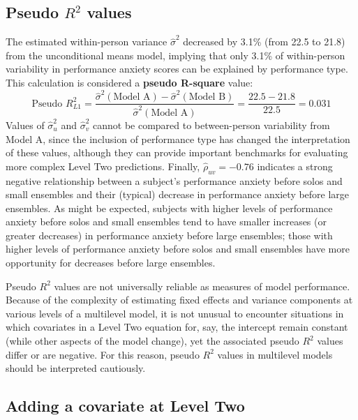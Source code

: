 \documentclass[
]{krantz}
\begin{document}
\hypertarget{pseudoR2}{%
\subsection{\texorpdfstring{Pseudo \(R^2\) values}{Pseudo R\^{}2 values}}\label{pseudoR2}}

The estimated within-person variance \(\hat{\sigma}^2\) decreased by 3.1\% (from 22.5 to 21.8) from the unconditional means model, implying that only 3.1\% of within-person variability in performance anxiety scores can be explained by performance type. This calculation is considered a \textbf{pseudo R-square} value:
\begin{equation}
\textrm{Pseudo }R^2_{L1} = \frac{\hat{\sigma}^{2}(\textrm{Model A})-\hat{\sigma}^{2}(\textrm{Model B})}{\hat{\sigma}^{2}(\textrm{Model A})} = \frac{22.5-21.8}{22.5} = 0.031
\label{eq:pseudo}
\end{equation}
Values of \(\hat{\sigma}_{u}^{2}\) and \(\hat{\sigma}_{v}^{2}\) cannot be compared to between-person variability from Model A, since the inclusion of performance type has changed the interpretation of these values, although they can provide important benchmarks for evaluating more complex Level Two predictions. Finally, \(\hat{\rho}_{uv}=-0.76\) indicates a strong negative relationship between a subject's performance anxiety before solos and small ensembles and their (typical) decrease in performance anxiety before large ensembles. As might be expected, subjects with higher levels of performance anxiety before solos and small ensembles tend to have smaller increases (or greater decreases) in performance anxiety before large ensembles; those with higher levels of performance anxiety before solos and small ensembles have more opportunity for decreases before large ensembles.

Pseudo \(R^2\) values are not universally reliable as measures of model performance. Because of the complexity of estimating fixed effects and variance components at various levels of a multilevel model, it is not unusual to encounter situations in which covariates in a Level Two equation for, say, the intercept remain constant (while other aspects of the model change), yet the associated pseudo \(R^2\) values differ or are negative. For this reason, pseudo \(R^2\) values in multilevel models should be interpreted cautiously.

\hypertarget{modelc}{%
\subsection{Adding a covariate at Level Two}\label{modelc}}
\end{document}
